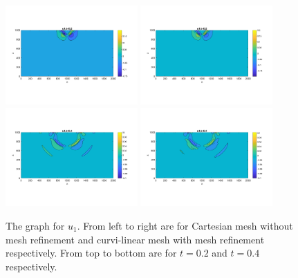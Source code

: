 \documentclass[a4paper]{article}
\begin{document}
\begin{figure}[H]
	\centering
	\includegraphics[width=0.45\textwidth]{u1_t02_cartesian.png}
	\includegraphics[width=0.45\textwidth]{u1_t02_curvi_mr.png}\\
	\includegraphics[width=0.45\textwidth]{u1_t04_cartesian.png}
	\includegraphics[width=0.45\textwidth]{u1_t04_curvi_mr.png}
	\caption{\scriptsize{The graph for $u_1$. From left to right are for Cartesian mesh without mesh refinement and curvi-linear mesh with mesh refinement respectively. From top to bottom are for $t = 0.2$ and $t = 0.4$ respectively.}}\label{u1}
\end{figure}
\end{document}
